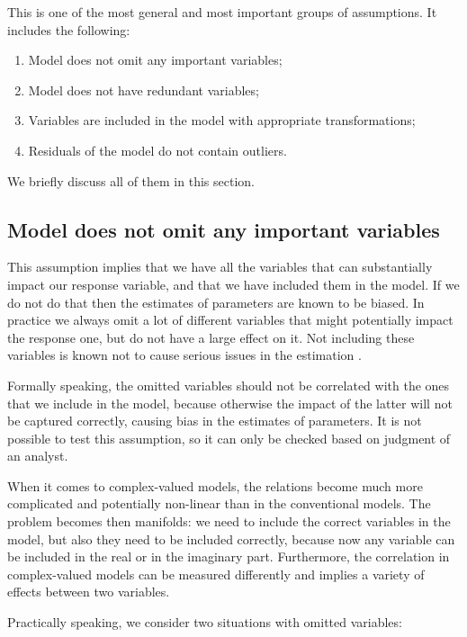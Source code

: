 \documentclass[
]{book}
\providecommand{\tightlist}{%
  \setlength{\itemsep}{0pt}\setlength{\parskip}{0pt}}
\begin{document}
This is one of the most general and most important groups of assumptions. It includes the following:

\begin{enumerate}
\def\labelenumi{\arabic{enumi}.}
\tightlist
\item
  Model does not omit any important variables;
\item
  Model does not have redundant variables;
\item
  Variables are included in the model with appropriate transformations;
\item
  Residuals of the model do not contain outliers.
\end{enumerate}

We briefly discuss all of them in this section.

\hypertarget{assumptionsSpecificationOmit}{%
\subsection{Model does not omit any important variables}\label{assumptionsSpecificationOmit}}

This assumption implies that we have all the variables that can substantially impact our response variable, and that we have included them in the model. If we do not do that then the estimates of parameters are known to be biased. In practice we always omit a lot of different variables that might potentially impact the response one, but do not have a large effect on it. Not including these variables is known not to cause serious issues in the estimation \citep{econometrics}.

Formally speaking, the omitted variables should not be correlated with the ones that we include in the model, because otherwise the impact of the latter will not be captured correctly, causing bias in the estimates of parameters. It is not possible to test this assumption, so it can only be checked based on judgment of an analyst.

When it comes to complex-valued models, the relations become much more complicated and potentially non-linear than in the conventional models. The problem becomes then manifolds: we need to include the correct variables in the model, but also they need to be included correctly, because now any variable can be included in the real or in the imaginary part. Furthermore, the correlation in complex-valued models can be measured differently and implies a variety of effects between two variables.

Practically speaking, we consider two situations with omitted variables:
\end{document}

